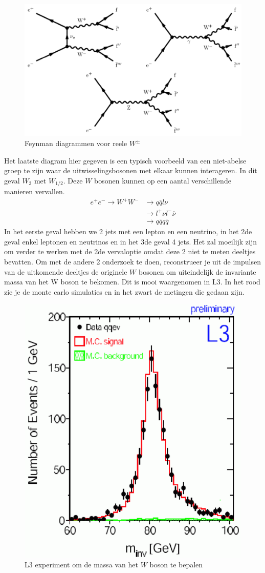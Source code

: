 \documentclass[../main.tex]{subfiles}
\begin{document}
\begin{figure}[h]
    \centering
    \includegraphics[width=0.6\linewidth]{elektroweak_precision_tests/reele_w_diagrammen.png}
    \caption{Feynman diagrammen voor reele $W^\pm$}%
    \label{fig:elektroweak_precision_tests/reele_w_diagrammen}
\end{figure}

Het laatste diagram hier gegeven is een typisch voorbeeld van een niet-abelse groep te zijn waar de uitwisselingsbosonen met elkaar kunnen interageren. In dit geval $W_3$ met $W_{1/2}$. Deze $W$ bosonen kunnen op een aantal verschillende manieren vervallen.
\begin{equation}
    \begin{aligned}
        \label{eq:verval_w_boson}
        e^+e^- \rightarrow W^+W^- &\rightarrow q\overline q l\nu\\
                                  &\rightarrow l^+\nu l^-\overline \nu\\
                                  &\rightarrow q\overline q q\overline q
    \end{aligned}
\end{equation}
In het eerste geval hebben we 2 jets met een lepton en een neutrino, in het 2de geval enkel leptonen en neutrinos en in het 3de geval 4 jets. Het zal moeilijk zijn om verder te werken met de 2de vervaloptie omdat deze 2 niet te meten deeltjes bevatten. Om met de andere 2 onderzoek te doen, reconstrueer je uit de impulsen van de uitkomende deeltjes de originele $W$ bosonen om uiteindelijk de invariante massa van het W boson te bekomen. Dit is mooi waargenomen in L3. In het rood zie je de monte carlo simulaties en in het zwart de metingen die gedaan zijn.

\begin{figure}[h]
    \centering
    \includegraphics[width=0.4\linewidth]{elektroweak_precision_tests/invar_massa_w.png}
    \caption{L3 experiment om de massa van het $W$ boson te bepalen}%
    \label{fig:elektroweak_precision_tests/invar_massa_w}
\end{figure}
\end{document}
